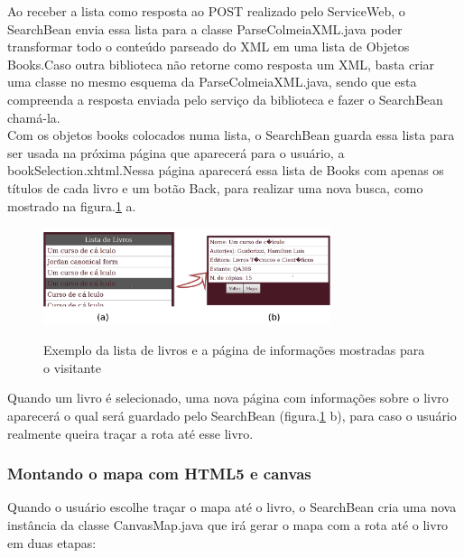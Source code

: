 \documentclass[a4paper,10pt]{article}
\begin{document}
	Ao receber a lista como resposta ao POST realizado pelo ServiceWeb, o SearchBean envia essa lista para 
	a classe ParseColmeiaXML.java poder
	transformar todo o conteúdo parseado do XML em uma lista de Objetos Books.Caso outra biblioteca não retorne como resposta um XML, 
	 basta criar uma classe no mesmo esquema da ParseColmeiaXML.java, sendo que esta compreenda a resposta enviada
	pelo serviço da biblioteca e fazer o SearchBean chamá-la.\\

	Com os objetos books colocados numa lista, o SearchBean guarda essa lista para ser usada na próxima página que aparecerá
	para o usuário, a bookSelection.xhtml.Nessa página aparecerá essa lista de Books com apenas os títulos de cada livro e um botão 
	Back,
	para realizar uma nova busca, como mostrado na figura.\ref{selectBook} a.

		\begin{figure}[H]
	\centering
	\includegraphics[width=0.75\textwidth]{./imgs/selectBook.png}\\[0.5cm]    
	\caption{Exemplo da lista de livros e a página de informações mostradas para o visitante  }
	\label{selectBook}

\end{figure}
	Quando um livro é selecionado, uma nova página com informações sobre o livro aparecerá o qual será guardado pelo SearchBean (figura.\ref{selectBook} b), para caso o
	usuário realmente queira traçar a rota até esse livro.\\
	
			
	\subsubsection{Montando o mapa com HTML5 e canvas}

	Quando o usuário escolhe traçar o mapa até o livro, o SearchBean cria uma nova instância da classe CanvasMap.java que irá gerar
	o mapa com a rota até o livro em duas etapas:
\end{document}
